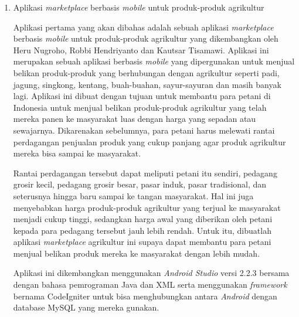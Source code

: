 \documentclass[a4paper]{article}
\begin{document}
\begin{enumerate}
    \item Aplikasi \textit{marketplace} berbasis \textit{mobile} untuk produk-produk agrikultur
    
    Aplikasi pertama yang akan dibahas adalah sebuah aplikasi \textit{marketplace} berbasis \textit{mobile} untuk produk-produk agrikultur yang dikembangkan oleh Heru Nugroho, Robbi Hendriyanto dan Kautsar Tisamawi. Aplikasi ini merupakan sebuah aplikasi berbasis \textit{mobile} yang dipergunakan untuk menjual belikan produk-produk yang berhubungan dengan agrikultur seperti padi, jagung, singkong, kentang, buah-buahan, sayur-sayuran dan masih banyak lagi. Aplikasi ini dibuat dengan tujuan untuk membantu para petani di Indonesia untuk menjual belikan produk-produk agrikultur yang telah mereka panen ke masyarakat luas dengan harga yang sepadan atau sewajarnya. Dikarenakan sebelumnya, para petani harus melewati rantai perdagangan penjualan produk yang cukup panjang agar produk agrikultur mereka bisa sampai ke masyarakat\autocite{agriculture-marketplace}. 
    
    Rantai perdagangan tersebut dapat meliputi petani itu sendiri, pedagang grosir kecil, pedagang grosir besar, pasar induk, pasar tradisional, dan seterusnya hingga baru sampai ke tangan masyarakat. Hal ini juga menyebabkan harga produk-produk agrikultur yang terjual ke masyarakat menjadi cukup tinggi, sedangkan harga awal yang diberikan oleh petani kepada para pedagang tersebut jauh lebih rendah. Untuk itu, dibuatlah aplikasi \textit{marketplace} agrikultur ini supaya dapat membantu para petani menjual belikan produk mereka ke masyarakat dengan lebih mudah\autocite{agriculture-marketplace}. 

    Aplikasi ini dikembangkan menggunakan \textit{Android Studio} versi 2.2.3 bersama dengan bahasa pemrograman Java dan XML serta menggunakan \textit{framework} bernama CodeIgniter untuk bisa menghubungkan antara \textit{Android} dengan database MySQL yang mereka gunakan\autocite{agriculture-marketplace}. 
    

\end{enumerate}
\end{document}
